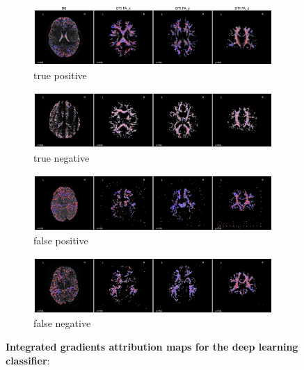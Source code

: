\documentclass[fleqn,10pt]{wlscirep}
\begin{document}
\begin{figure}[tbp]
    \centering
    \begin{subfigure}{\textwidth}
    \centering
    \includegraphics[width=0.9\linewidth]{deep-learning-qc/attribution-maps-true-pos.pdf}
    \caption{true positive}
    \label{fig:ig:true-pos}
    \end{subfigure}
    \begin{subfigure}{\textwidth}
    \centering
    \includegraphics[width=0.9\linewidth]{deep-learning-qc/attribution-maps-true-neg.pdf}
    \caption{true negative}
    \label{fig:ig:true-neg}
    \end{subfigure}
    \begin{subfigure}{\textwidth}
    \centering
    \includegraphics[width=0.9\linewidth]{deep-learning-qc/attribution-maps-false-pos.pdf}
    \caption{false positive}
    \label{fig:ig:false-pos}
    \end{subfigure}
    \begin{subfigure}{\textwidth}
    \centering
    \includegraphics[width=0.9\linewidth]{deep-learning-qc/attribution-maps-false-neg.pdf}
    \caption{false negative}
    \label{fig:ig:false-neg}
    \end{subfigure}
    \caption{%
        {\bf Integrated gradients attribution maps for the deep learning classifier}:
}
\end{figure}
\end{document}
